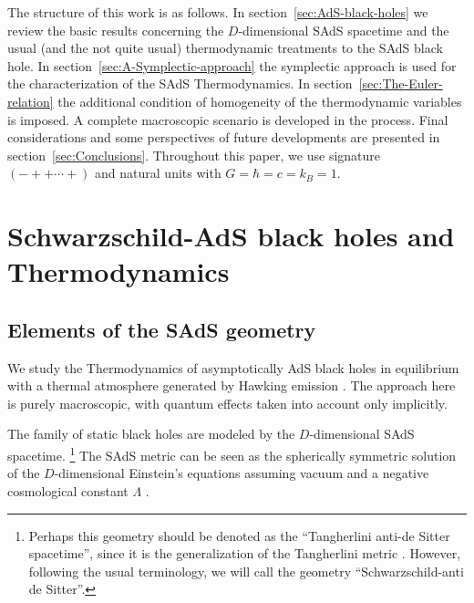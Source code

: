 \documentclass[prd,onecolumn,notitlepage,amsmath,nofootinbib,superscriptaddress,showpacs,showkeys]{revtex4-1}
\begin{document}
The structure of this work is as follows. In section~\ref{sec:AdS-black-holes}
we review the basic results concerning the $D$-dimensional SAdS spacetime
and the usual (and the not quite usual) thermodynamic treatments to
the SAdS black hole. In section~\ref{sec:A-Symplectic-approach}
the symplectic approach is used for the characterization of the SAdS
Thermodynamics. In section~\ref{sec:The-Euler-relation} the additional
condition of homogeneity of the thermodynamic variables is imposed.
A complete macroscopic scenario is developed in the process. Final
considerations and some perspectives of future developments are presented
in section~\ref{sec:Conclusions}. Throughout this paper, we use
signature $(-++ \cdots +)$ and natural units with $G=\hbar=c=k_{B}=1$.



\section{\label{sec:AdS-black-holes}Schwarzschild-A\MakeLowercase{d}S black holes and Thermodynamics}

\subsection{Elements of the SAdS geometry}

We study the Thermodynamics of asymptotically AdS black holes in equilibrium
with a thermal atmosphere generated by Hawking emission \cite{wald}.
The approach here is purely macroscopic, with quantum effects taken
into account only implicitly.

The family of static black holes are modeled by the $D$-dimensional
SAdS spacetime.%
\footnote{Perhaps this geometry should be denoted as the ``Tangherlini anti-de
Sitter spacetime'', since it is the generalization of the Tangherlini
metric \cite{tangherlini}. However, following the usual terminology, 
we will call the geometry ``Schwarzschild-anti de Sitter''.%
} 
%
The SAdS metric can be seen
as the spherically symmetric solution of the $D$-dimensional Einstein's
equations assuming vacuum and a negative cosmological constant $\Lambda$
\cite{nat2015,Boucher}.
\end{document}
